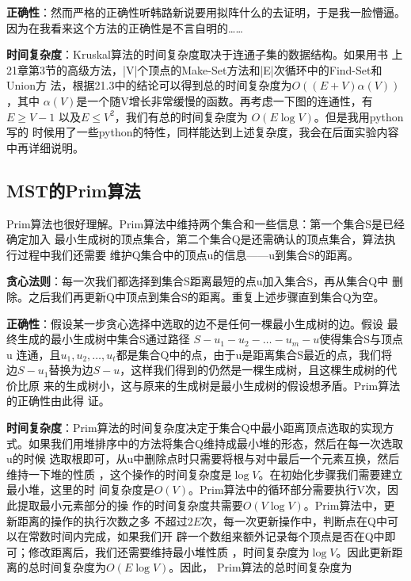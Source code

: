\documentclass[12pt]{article}
\begin{document}
\medskip

\textbf{正确性}：然而严格的正确性听韩路新说要用拟阵什么的去证明，于是我一脸懵逼。
因为在我看来这个方法的正确性是不言自明的……

\medskip

\textbf{时间复杂度}：Kruskal算法的时间复杂度取决于连通子集的数据结构。如果用书
上21章第3节的高级方法，|V|个顶点的Make-Set方法和|E|次循环中的Find-Set和Union方
法，根据21.3中的结论可以得到总的时间复杂度为$ O((E+V)\alpha(V)) $，其中
$ \alpha(V) $是一个随V增长非常缓慢的函数。再考虑一下图的连通性，有$ E\geq V-1 $
以及$ E \leq V^2 $，我们有总的时间复杂度为 $ O(E\log{V}) $。但是我用python写的
时候用了一些python的特性，同样能达到上述复杂度，我会在后面实验内容中再详细说明。

\subsection*{MST的Prim算法}
Prim算法也很好理解。Prim算法中维持两个集合和一些信息：第一个集合S是已经确定加入
最小生成树的顶点集合，第二个集合Q是还需确认的顶点集合，算法执行过程中我们还需要
维护Q集合中的顶点u的信息——u到集合S的距离。

\medskip

\textbf{贪心法则}：每一次我们都选择到集合S距离最短的点u加入集合S，再从集合Q中
删除。之后我们再更新Q中顶点到集合S的距离。重复上述步骤直到集合Q为空。

\medskip

\textbf{正确性}：假设某一步贪心选择中选取的边不是任何一棵最小生成树的边。假设
最终生成的最小生成树中集合S通过路径 $S-u_1-u_2-\ldots -u_m-u$使得集合S与顶点u
连通，且$u_1,u_2,\ldots,u_t$都是集合Q中的点，由于u是距离集合S最近的点，我们将
边$S-u_1$替换为边$S-u$，这样我们得到的仍然是一棵生成树，且这棵生成树的代价比原
来的生成树小，这与原来的生成树是最小生成树的假设想矛盾。Prim算法的正确性由此得
证。

\medskip

\textbf{时间复杂度}：Prim算法的时间复杂度决定于集合Q中最小距离顶点选取的实现方
式。如果我们用堆排序中的方法将集合Q维持成最小堆的形态，然后在每一次选取u的时候
选取根即可，从u中删除点时只需要将根与对中最后一个元素互换，然后维持一下堆的性质
，这个操作的时间复杂度是$ \log{V} $。在初始化步骤我们需要建立最小堆，这里的时
间复杂度是$ O(V) $。Prim算法中的循环部分需要执行V次，因此提取最小元素部分的操
作的时间复杂度共需要$ O(V\log{V}) $。Prim算法中，更新距离的操作的执行次数之多
不超过$ 2E $次，每一次更新操作中，判断点在Q中可以在常数时间内完成，如果我们开
辟一个数组来额外记录每个顶点是否在Q中即可；修改距离后，我们还需要维持最小堆性质
，时间复杂度为$ \log{V} $。因此更新距离的总时间复杂度为$ O(E\log{V}) $。因此，
Prim算法的总时间复杂度为
\end{document}
